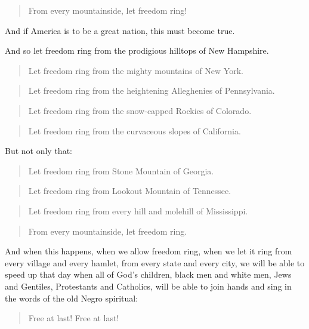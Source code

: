 \documentclass[a4paper]{amsbook}
\begin{document}
\begin{quote}From every mountainside, let freedom ring!\end{quote}

And if America is to be a great nation, this must become true.

And so let freedom ring from the prodigious hilltops of New Hampshire.

\begin{quote}Let freedom ring from the mighty mountains of New York.\end{quote}

\begin{quote}Let freedom ring from the heightening Alleghenies of Pennsylvania.\end{quote}

\begin{quote}Let freedom ring from the snow-capped Rockies of Colorado.\end{quote}

\begin{quote}Let freedom ring from the curvaceous slopes of California.\end{quote}

But not only that:

\begin{quote}Let freedom ring from Stone Mountain of Georgia.\end{quote}

\begin{quote}Let freedom ring from Lookout Mountain of Tennessee.\end{quote}

\begin{quote}Let freedom ring from every hill and molehill of Mississippi.\end{quote}

\begin{quote}From every mountainside, let freedom ring.\end{quote}

And when this happens, when we allow freedom ring, when we let it ring from every village and every hamlet, from every state and every city, we will be able to speed up that day when all of God's children, black men and white men, Jews and Gentiles, Protestants and Catholics, will be able to join hands and sing in the words of the old Negro spiritual:

\begin{quote}Free at last! Free at last!\end{quote}
\end{document}
